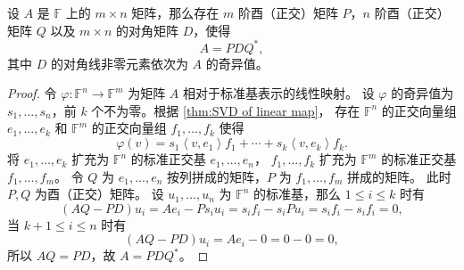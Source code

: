 \documentclass[fontset=none,zihao=-4]{Notes}
\newcommand{\inn}[1]{\left\langle#1\right\rangle}
\begin{document}
\begin{theorem}[矩阵的奇异值分解]\label{thm:SVD of matrix}
  设 $A$ 是 $\mathbb{F}$ 上的 $m\times n$ 矩阵，那么存在 $m$ 阶酉（正交）矩阵
  $P$，$n$ 阶酉（正交）矩阵 $Q$ 以及 $m\times n$ 的对角矩阵 $D$，使得
  \[
    A=PDQ^*,  
  \]
  其中 $D$ 的对角线非零元素依次为 $A$ 的奇异值。
\end{theorem}
\begin{proof}
  令 $\varphi:\mathbb{F}^n\to\mathbb{F}^m$ 为矩阵 $A$ 相对于标准基表示的线性映射。
  设 $\varphi$ 的奇异值为 $s_1,\dots,s_n$，前 $k$ 个不为零。根据 \autoref{thm:SVD of linear map}，
  存在 $\mathbb{F}^n$ 的正交向量组 $e_1,\dots,e_k$ 和 $\mathbb{F}^m$ 的正交向量组
  $f_1,\dots,f_k$ 使得
  \[
    \varphi(v)=s_1\inn{v,e_1}f_1+\cdots+s_k\inn{v,e_k}f_k.
  \]
  将 $e_1,\dots,e_k$ 扩充为 $\mathbb{F}^n$ 的标准正交基 $e_1,\dots,e_n$，
   $f_1,\dots,f_k$ 扩充为 $\mathbb{F}^m$ 的标准正交基 $f_1,\dots,f_m$。
  令 $Q$ 为 $e_1,\dots,e_n$ 按列拼成的矩阵，$P$ 为 $f_1,\dots,f_m$ 拼成的矩阵。
  此时 $P,Q$ 为酉（正交）矩阵。
  设 $u_1,\dots,u_n$ 为 $\mathbb{F}^n$ 的标准基，那么
  $1\leq i\leq k$ 时有
  \[
    (AQ-PD)u_i=Ae_i-Ps_iu_i =s_if_i-s_iPu_i=s_if_i-s_if_i=0,
  \]
  当 $k+1\leq i\leq n$ 时有
  \[
    (AQ-PD)u_i=Ae_i-0=0-0=0,
  \]
  所以 $AQ=PD$，故 $A=PDQ^*$。
\end{proof}
\end{document}
